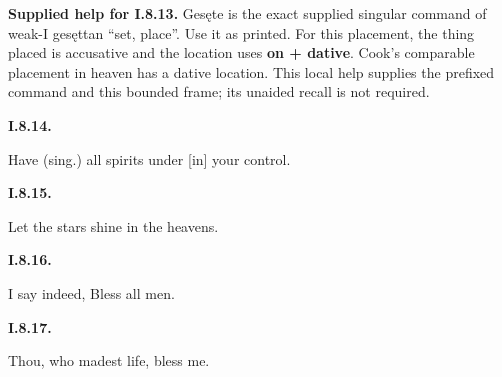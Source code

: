 \textbf{Supplied help for I.8.13.} Gesęte is the exact supplied singular command of weak-I gesęttan “set, place”. Use it as printed. For this placement, the thing placed is accusative and the location uses \textbf{on + dative}. Cook’s comparable placement in heaven has a dative location. This local help supplies the prefixed command and this bounded frame; its unaided recall is not required.

\par\begin{minipage}{\linewidth}\raggedright
\textbf{I.8.14.}

Have (sing.) all spirits under [in] your control.

\end{minipage}\par\addvspace{4pt}

\par\begin{minipage}{\linewidth}\raggedright
\textbf{I.8.15.}

Let the stars shine in the heavens.

\end{minipage}\par\addvspace{4pt}

\par\begin{minipage}{\linewidth}\raggedright
\textbf{I.8.16.}

I say indeed, Bless all men.

\end{minipage}\par\addvspace{4pt}

\par\begin{minipage}{\linewidth}\raggedright
\textbf{I.8.17.}

Thou, who madest life, bless me.

\end{minipage}\par\addvspace{4pt}

